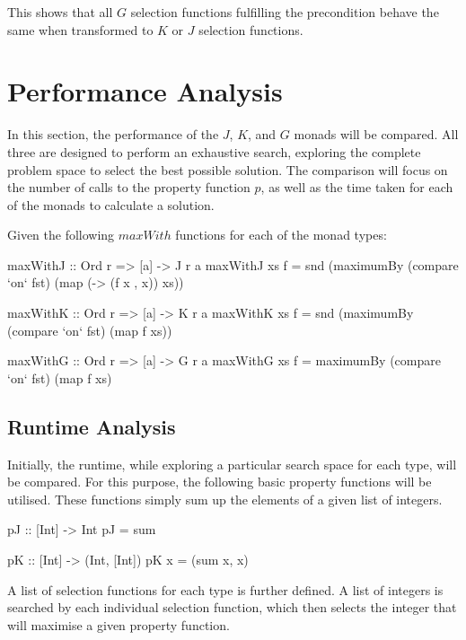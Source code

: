 \documentclass[runningheads]{llncs}
\begin{document}
This shows that all \(G\) selection functions fulfilling the
precondition behave the same when transformed to \(K\) or \(J\)
selection functions.

\section{Performance Analysis}\label{performance-analysis}

In this section, the performance of the \(J\), \(K\), and \(G\) monads
will be compared. All three are designed to perform an exhaustive
search, exploring the complete problem space to select the best possible
solution. The comparison will focus on the number of calls to the
property function \(p\), as well as the time taken for each of the
monads to calculate a solution.

\qquad Given the following \(maxWith\) functions for each of the monad
types:

\begin{code}
maxWithJ :: Ord r => [a] -> J r a
maxWithJ xs f = snd (maximumBy (compare `on` fst) 
                               (map (\x -> (f x , x)) xs))
\end{code}

\begin{code}
maxWithK :: Ord r => [a] -> K r a
maxWithK xs f = snd (maximumBy (compare `on` fst) (map f xs))
\end{code}

\begin{code}
maxWithG :: Ord r => [a] -> G r a
maxWithG xs f = maximumBy (compare `on` fst) (map f xs)
\end{code}

\subsection{Runtime Analysis}\label{runtime-analysis}

Initially, the runtime, while exploring a particular search space for
each type, will be compared. For this purpose, the following basic
property functions will be utilised. These functions simply sum up the
elements of a given list of integers.

\begin{code}
pJ :: [Int] -> Int
pJ = sum

pK :: [Int] -> (Int, [Int])
pK x = (sum x, x)
\end{code}

A list of selection functions for each type is further defined. A list
of integers is searched by each individual selection function, which
then selects the integer that will maximise a given property function.
\end{document}
